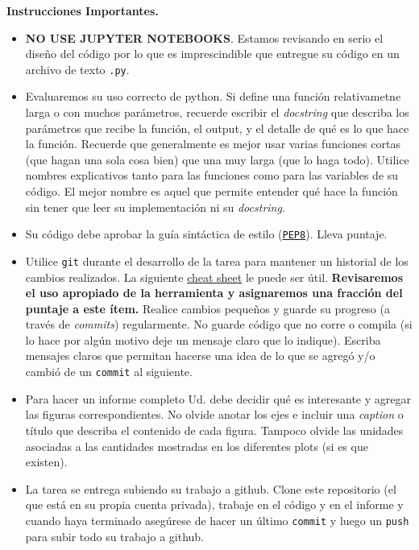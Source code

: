 \documentclass[letter, 11pt]{article}
\begin{document}
\pagebreak
\noindent\textbf{Instrucciones Importantes.}
\begin{itemize}

\item \textbf{NO USE JUPYTER NOTEBOOKS}. Estamos revisando en serio el diseño
  del código por lo que es imprescindible que entregue su código en un archivo
  de texto \texttt{.py}.

\item Evaluaremos su uso correcto de python. Si define una función
  relativametne larga o con muchos parámetros, recuerde escribir el
  \emph{docstring} que describa los parámetros que recibe la función, el
  output, y el detalle de qué es lo que hace la función. Recuerde que
  generalmente es mejor usar varias funciones cortas (que hagan una sola cosa
  bien) que una muy larga (que lo haga todo).  Utilice nombres explicativos
  tanto para las funciones como para las variables de su código. El mejor
  nombre es aquel que permite entender qué hace la función sin tener que leer
  su implementación ni su \emph{docstring}.

\item Su código debe aprobar la guía sintáctica de estilo
  (\href{https://www.python.org/dev/peps/pep-0008/}{\texttt{PEP8}}). Lleva
  puntaje.

\item Utilice \texttt{git} durante el desarrollo de la tarea para mantener un
  historial de los cambios realizados. La siguiente
  \href{https://education.github.com/git-cheat-sheet-education.pdf}{cheat
    sheet} le puede ser útil. {\bf Revisaremos el uso apropiado de la
  herramienta y asignaremos una fracción del puntaje a este ítem.} Realice
  cambios pequeños y guarde su progreso (a través de \emph{commits})
  regularmente. No guarde código que no corre o compila (si lo hace por algún
  motivo deje un mensaje claro que lo indique). Escriba mensajes claros que
  permitan hacerse una idea de lo que se agregó y/o cambió de un
  \texttt{commit} al siguiente.

\item Para hacer un informe completo Ud. debe decidir qué es interesante y
  agregar las figuras correspondientes. No olvide anotar los ejes e incluir una
  \emph{caption} o título que describa el contenido de cada figura. Tampoco
  olvide las unidades asociadas a las cantidades mostradas en los diferentes
  plots (si es que existen).

\item La tarea se entrega subiendo su trabajo a github. Clone este repositorio
  (el que está en su propia cuenta privada), trabaje en el código y en el
  informe y cuando haya terminado asegúrese de hacer un último \texttt{commit}
  y luego un \texttt{push} para subir todo su trabajo a github.


\end{itemize}
\end{document}
